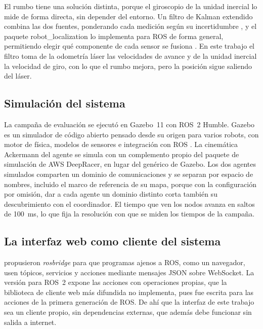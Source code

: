 El rumbo tiene una solución distinta, porque el giroscopio de la unidad inercial lo mide de forma directa, sin
depender del entorno. Un filtro de Kalman extendido combina las dos fuentes, ponderando cada medición según su
incertidumbre \autocite{thrun2005probabilistic}, y el paquete robot\_localization lo implementa para ROS de forma
general, permitiendo elegir qué componente de cada sensor se fusiona \autocite{moore2014generalized}. En este
trabajo el filtro toma de la odometría láser las velocidades de avance y de la unidad inercial la velocidad de
giro, con lo que el rumbo mejora, pero la posición sigue saliendo del láser.

\subsection{Simulación del sistema}
\label{sec:teo-simulacion}

La campaña de evaluación se ejecutó en Gazebo~11 con ROS~2 Humble. Gazebo es un simulador de código abierto
pensado desde su origen para varios robots, con motor de física, modelos de sensores e integración con ROS
\autocite{koenig2004gazebo}. La cinemática Ackermann del agente se simula con un complemento propio del paquete de
simulación de AWS DeepRacer, en lugar del genérico de Gazebo. Los dos agentes simulados comparten un dominio de
comunicaciones y se separan por espacio de nombres, incluido el marco de referencia de su mapa, porque con la
configuración por omisión, dar a cada agente un dominio distinto corta también su descubrimiento con el coordinador.
El tiempo que ven los nodos avanza en saltos de 100~ms, lo que fija la resolución con que se miden los tiempos de la
campaña.

\subsection{La interfaz web como cliente del sistema}
\label{sec:teo-interfaz}

\textcite{crick2017rosbridge} propusieron \textit{rosbridge} para que programas
ajenos a ROS, como un navegador, usen tópicos, servicios y acciones mediante
mensajes JSON sobre WebSocket. La versión para ROS~2 expone las acciones con
operaciones propias, que la biblioteca de cliente web más difundida no
implementa, pues fue escrita para las acciones de la primera generación de ROS.
De ahí que la interfaz de este trabajo sea un cliente propio, sin dependencias
externas, que además debe funcionar sin salida a internet.

